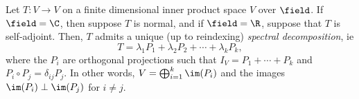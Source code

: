 \begin{theorem}\label{thm:spectral}
    Let $T : V \to V$ on a finite dimensional inner product space $V$ over $\field$. If $\field = \C$, then suppose $T$ is normal, and if $\field = \R$, suppose that $T$ is self-adjoint. Then, $T$ admits a unique (up to reindexing) \emph{spectral decomposition}, ie \[
    T = \lambda_1 P_1 + \lambda_2 P_2 + \cdots + \lambda_k P_k,
    \]
    where the $P_i$ are orthogonal projections such that $I_V = P_1 + \cdots + P_k$ and $P_i \circ P_j = \delta_{ij} P_{j}$. In other words, $V = \bigoplus_{i=1}^k \im(P_i)$ and the images $\im(P_i) \perp \im(P_j)$ for $i \neq j$.
\end{theorem}